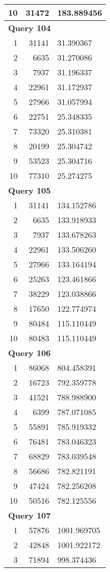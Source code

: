 \begin{longtable}[{p}]{@{}rrp{}@{}}
10 & 31472 & 183.889456 \\
\midrule
\multicolumn{3}{l}{\bfseries Query 104} \\
1 & 31141 & 31.390367 \\
2 & 6635 & 31.270086 \\
3 & 7937 & 31.196337 \\
4 & 22961 & 31.172937 \\
5 & 27966 & 31.057994 \\
6 & 22751 & 25.348335 \\
7 & 73320 & 25.310381 \\
8 & 20199 & 25.304742 \\
9 & 53523 & 25.304716 \\
10 & 77310 & 25.274275 \\
\midrule
\multicolumn{3}{l}{\bfseries Query 105} \\
1 & 31141 & 134.152786 \\
2 & 6635 & 133.918933 \\
3 & 7937 & 133.678263 \\
4 & 22961 & 133.506260 \\
5 & 27966 & 133.164194 \\
6 & 25263 & 123.461866 \\
7 & 38229 & 123.038866 \\
8 & 17650 & 122.774974 \\
9 & 80484 & 115.110449 \\
10 & 80483 & 115.110449 \\
\midrule
\multicolumn{3}{l}{\bfseries Query 106} \\
1 & 86068 & 804.458391 \\
2 & 16723 & 792.359778 \\
3 & 41521 & 788.988900 \\
4 & 6399 & 787.071085 \\
5 & 55891 & 785.919332 \\
6 & 76481 & 783.046323 \\
7 & 68829 & 783.039548 \\
8 & 56686 & 782.821191 \\
9 & 47424 & 782.256208 \\
10 & 50516 & 782.125556 \\
\midrule
\multicolumn{3}{l}{\bfseries Query 107} \\
1 & 57876 & 1001.969705 \\
2 & 42848 & 1001.922172 \\
3 & 71894 & 998.374436 \\

\end{longtable}
